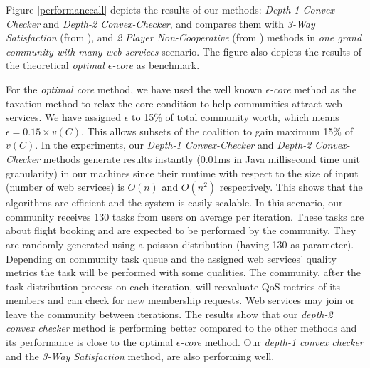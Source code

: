 Figure \ref{performanceall} depicts the results of our methods:
\emph{Depth-1 Convex-Checker} and \emph{Depth-2 Convex-Checker},
and compares them with \emph{3-Way Satisfaction} (from
\cite{DBLP:conf/IEEEscc/LimTMB12}), and \emph{2 Player
Non-Cooperative} (from \cite{DBLP:conf/IEEEscc/KhosravifarABT11})
methods in \emph{one grand community with many web services}
scenario. The figure also depicts the results of the theoretical
\emph{optimal $\epsilon$-core} as benchmark.


For the \emph{optimal core} method, we have used the well known
\emph{$\epsilon$-core} method as the taxation method to relax the
core condition to help communities attract web services. We have
assigned $\epsilon$ to 15\% of total community worth, which means
$\epsilon = 0.15 \times v(C)$. This allows subsets of the
coalition to gain maximum 15\% of $v(C)$.
In the experiments, our \emph{Depth-1 Convex-Checker} and
\emph{Depth-2 Convex-Checker} methods generate results instantly
(0.01ms in Java millisecond time unit granularity) in our machines
since their runtime with respect to the size of input (number of
web services) is $O(n)$ and $O(n^2)$ respectively. This shows that
the algorithms are efficient and the system is easily scalable. In
this scenario, our community receives 130 tasks from users on
average per iteration. These tasks are about flight booking and
are expected to be performed by the community. They are randomly
generated using a poisson distribution (having 130 as parameter).
Depending on community task queue and the assigned web services'
quality metrics the task will be performed with some qualities.
The community, after the task distribution process on each
iteration, will reevaluate QoS metrics of its members and can
check for new membership requests. Web services may join or leave
the community between iterations. The results show that our
\emph{depth-2 convex checker} method is performing better compared
to the other methods and its performance is close to the optimal
\emph{$\epsilon$-core} method. Our \emph{depth-1 convex checker}
and the \emph{3-Way Satisfaction} method, are also performing
well.

